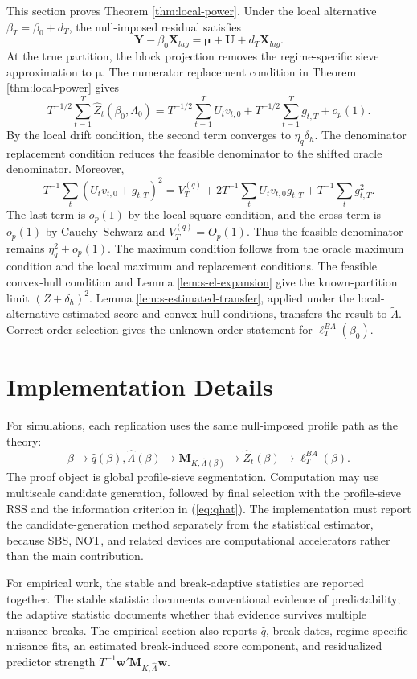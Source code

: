 \documentclass[10pt]{book}
\numberwithin{equation}{section}
\theoremstyle{definition}
\begin{document}
This section proves Theorem \ref*{thm:local-power}. Under the local alternative \(\beta_T=\beta_0+d_T\), the null-imposed residual satisfies
\[
    \bm Y-\beta_0\bm X_{lag}
    =
    \bm\mu+\bm U+d_T\bm X_{lag}.
\]
At the true partition, the block projection removes the regime-specific sieve approximation to \(\bm\mu\). The numerator replacement condition in Theorem \ref*{thm:local-power} gives
\[
    T^{-1/2}\sum_{t=1}^T \widehat Z_t(\beta_0,\Lambda_0)
    =
    T^{-1/2}\sum_{t=1}^T U_tv_{t,0}
    +
    T^{-1/2}\sum_{t=1}^Tg_{t,T}
    +o_p(1).
\]
By the local drift condition, the second term converges to \(\eta_q\delta_h\). The denominator replacement condition reduces the feasible denominator to the shifted oracle denominator. Moreover,
\[
    T^{-1}\sum_t(U_tv_{t,0}+g_{t,T})^2
    =
    V_T^{(q)}
    +
    2T^{-1}\sum_tU_tv_{t,0}g_{t,T}
    +
    T^{-1}\sum_tg_{t,T}^2.
\]
The last term is \(o_p(1)\) by the local square condition, and the cross term is \(o_p(1)\) by Cauchy--Schwarz and \(V_T^{(q)}=O_p(1)\). Thus the feasible denominator remains \(\eta_q^2+o_p(1)\). The maximum condition follows from the oracle maximum condition and the local maximum and replacement conditions. The feasible convex-hull condition and Lemma \ref{lem:s-el-expansion} give the known-partition limit \((Z+\delta_h)^2\). Lemma \ref{lem:s-estimated-transfer}, applied under the local-alternative estimated-score and convex-hull conditions, transfers the result to \(\widetilde\Lambda\). Correct order selection gives the unknown-order statement for \(\ell_T^{BA}(\beta_0)\).
\section{Implementation Details}

For simulations, each replication uses the same null-imposed profile path as the theory:
\[
    \beta
    \to
    \widehat q(\beta),\widehat\Lambda(\beta)
    \to
    \bm M_{K,\widehat\Lambda(\beta)}
    \to
    \widehat Z_t(\beta)
    \to
    \ell_T^{BA}(\beta).
\]
The proof object is global profile-sieve segmentation. Computation may use multiscale candidate generation, followed by final selection with the profile-sieve RSS and the information criterion in (\ref*{eq:qhat}). The implementation must report the candidate-generation method separately from the statistical estimator, because SBS, NOT, and related devices are computational accelerators rather than the main contribution.

For empirical work, the stable and break-adaptive statistics are reported together. The stable statistic documents conventional evidence of predictability; the adaptive statistic documents whether that evidence survives multiple nuisance breaks. The empirical section also reports \(\widehat q\), break dates, regime-specific nuisance fits, an estimated break-induced score component, and residualized predictor strength \(T^{-1}\bm w'\bm M_{K,\widehat\Lambda}\bm w\).
\end{document}

